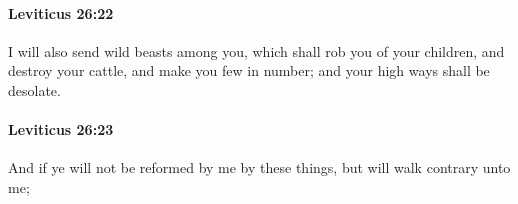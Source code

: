 		\paragraph{Leviticus 26:22} %
			\label{LEVITICUS-26-22}

			I will also send wild beasts among you, which shall rob you of your children, and destroy your cattle, and make you few in number; and your high ways shall be desolate.


		\paragraph{Leviticus 26:23} %
			\label{LEVITICUS-26-23}

			And if ye will not be reformed by me by these things, but will walk contrary unto me;



